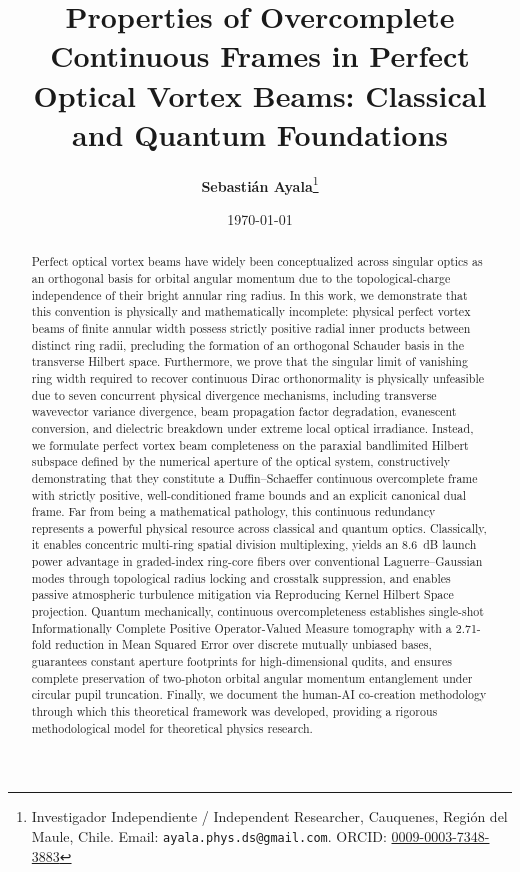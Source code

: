 \documentclass[11pt,a4paper]{article}
\title{\textbf{\LARGE Properties of Overcomplete Continuous Frames in Perfect Optical Vortex Beams: Classical and Quantum Foundations}}
\author{\textbf{Sebastián Ayala}\thanks{Investigador Independiente / Independent Researcher, Cauquenes, Regi{\'o}n del Maule, Chile. Email: \texttt{ayala.phys.ds@gmail.com}. ORCID: \href{https://orcid.org/0009-0003-7348-3883}{0009-0003-7348-3883}}}
\date{\today}
\begin{document}
\maketitle

\begin{abstract}
Perfect optical vortex beams have widely been conceptualized across singular optics as an orthogonal basis for orbital angular momentum due to the topological-charge independence of their bright annular ring radius. In this work, we demonstrate that this convention is physically and mathematically incomplete: physical perfect vortex beams of finite annular width possess strictly positive radial inner products between distinct ring radii, precluding the formation of an orthogonal Schauder basis in the transverse Hilbert space. Furthermore, we prove that the singular limit of vanishing ring width required to recover continuous Dirac orthonormality is physically unfeasible due to seven concurrent physical divergence mechanisms, including transverse wavevector variance divergence, beam propagation factor degradation, evanescent conversion, and dielectric breakdown under extreme local optical irradiance. Instead, we formulate perfect vortex beam completeness on the paraxial bandlimited Hilbert subspace defined by the numerical aperture of the optical system, constructively demonstrating that they constitute a Duffin--Schaeffer continuous overcomplete frame with strictly positive, well-conditioned frame bounds and an explicit canonical dual frame. Far from being a mathematical pathology, this continuous redundancy represents a powerful physical resource across classical and quantum optics. Classically, it enables concentric multi-ring spatial division multiplexing, yields an 8.6~dB launch power advantage in graded-index ring-core fibers over conventional Laguerre--Gaussian modes through topological radius locking and crosstalk suppression, and enables passive atmospheric turbulence mitigation via Reproducing Kernel Hilbert Space projection. Quantum mechanically, continuous overcompleteness establishes single-shot Informationally Complete Positive Operator-Valued Measure tomography with a 2.71-fold reduction in Mean Squared Error over discrete mutually unbiased bases, guarantees constant aperture footprints for high-dimensional qudits, and ensures complete preservation of two-photon orbital angular momentum entanglement under circular pupil truncation. Finally, we document the human-AI co-creation methodology through which this theoretical framework was developed, providing a rigorous methodological model for theoretical physics research.
\end{abstract}
\end{document}
